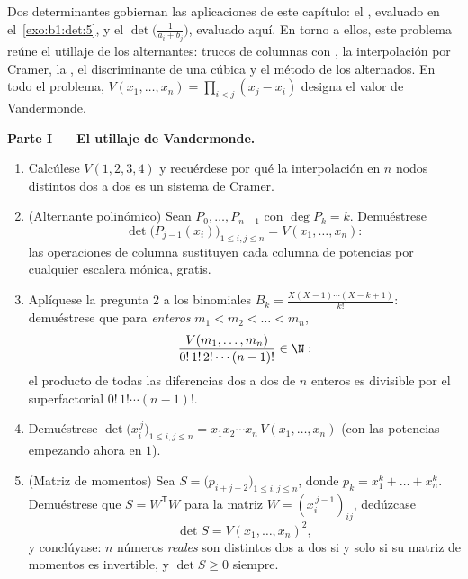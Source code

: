 \begin{problem}\label{pb:b1:det:1}
Dos determinantes gobiernan las aplicaciones de este capítulo: el
, evaluado en el~\cref{exo:b1:det:5}, y
el \emph{}
$\det\bigl(\frac{1}{a_i + b_j}\bigr)$, evaluado aquí. En torno a
ellos, este problema reúne el utillaje de los alternantes: trucos de
columnas con , la interpolación por Cramer, la
, el discriminante de una cúbica y el método de
los  alternados. En todo el problema,
$V(x_1, \dots, x_n) = \prod_{i < j}(x_j - x_i)$ designa el valor de
Vandermonde.

\medskip
\noindent\textbf{Parte I --- El utillaje de Vandermonde.}
\begin{enumerate}
  \item Calcúlese $V(1, 2, 3, 4)$ y recuérdese por qué la
        interpolación en $n$ nodos distintos dos a dos es un sistema
        de Cramer.
  \item (Alternante polinómico) Sean $P_0, \dots, P_{n-1}$
        \emph{} con $\deg P_k = k$. Demuéstrese
        \[
        \det\bigl(P_{j-1}(x_i)\bigr)_{1 \leq i, j \leq n}
        = V(x_1, \dots, x_n) :
        \]
        las operaciones de columna sustituyen cada columna de
        potencias por cualquier escalera mónica, gratis.
  \item Aplíquese la pregunta 2 a los  binomiales
        $B_k = \frac{X(X-1)\cdots(X-k+1)}{k!}$: demuéstrese que para
        \emph{enteros} $m_1 < m_2 < \dots < m_n$,
        \[
        \frac{V(m_1, \dots, m_n)}{0!\,1!\,2!\cdots(n-1)!}
        \in \N :
        \]
        el producto de todas las diferencias dos a dos de $n$
        enteros es divisible por el superfactorial
        $0!\,1!\cdots(n-1)!$.
  \item Demuéstrese $\det\bigl(x_i^{\,j}\bigr)_{1 \leq i, j \leq n}
        = x_1 x_2 \cdots x_n\, V(x_1, \dots, x_n)$ (con las
        potencias empezando ahora en $1$).
  \item (Matriz de momentos) Sea
        $S = \bigl(p_{i+j-2}\bigr)_{1 \leq i, j \leq n}$, donde
        $p_k = x_1^k + \dots + x_n^k$. Demuéstrese que
        $S = W^{\mathsf T} W$ para la matriz
        $W = (x_i^{\,j-1})_{ij}$, dedúzcase
        \[
        \det S = V(x_1, \dots, x_n)^2 ,
        \]
        y conclúyase: $n$ números \emph{reales} son distintos dos a
        dos si y solo si su matriz de momentos es invertible, y
        $\det S \geq 0$ siempre.
\end{enumerate}


\end{problem}
